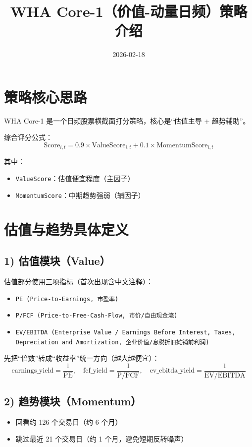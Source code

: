\documentclass[12pt,a4paper,fontset=fandol]{ctexart}
\title{WHA Core-1（价值-动量日频）策略介绍}
\author{}
\date{2026-02-18}
\begin{document}
\maketitle

\section{策略核心思路}
WHA Core-1 是一个日频股票横截面打分策略，核心是“估值主导 + 趋势辅助”。

综合评分公式：
\[
\mathrm{Score}_{i,t}=0.9\times\mathrm{ValueScore}_{i,t}+0.1\times\mathrm{MomentumScore}_{i,t}
\]

其中：
\begin{itemize}
  \item \texttt{ValueScore}：估值便宜程度（主因子）
  \item \texttt{MomentumScore}：中期趋势强弱（辅因子）
\end{itemize}

\section{估值与趋势具体定义}
\subsection*{1) 估值模块（Value）}
估值部分使用三项指标（首次出现含中文注释）：
\begin{itemize}
  \item \texttt{PE (Price-to-Earnings, 市盈率)}
  \item \texttt{P/FCF (Price-to-Free-Cash-Flow, 市价/自由现金流)}
  \item \texttt{EV/EBITDA (Enterprise Value / Earnings Before Interest, Taxes, Depreciation and Amortization, 企业价值/息税折旧摊销前利润)}
\end{itemize}

先把“倍数”转成“收益率”统一方向（越大越便宜）：
\[
\mathrm{earnings\_yield}=\frac{1}{\mathrm{PE}},\quad
\mathrm{fcf\_yield}=\frac{1}{\mathrm{P/FCF}},\quad
\mathrm{ev\_ebitda\_yield}=\frac{1}{\mathrm{EV/EBITDA}}
\]

\subsection*{2) 趋势模块（Momentum）}
\begin{itemize}
  \item 回看约 126 个交易日（约 6 个月）
  \item 跳过最近 21 个交易日（约 1 个月，避免短期反转噪声）
\end{itemize}
\end{document}
